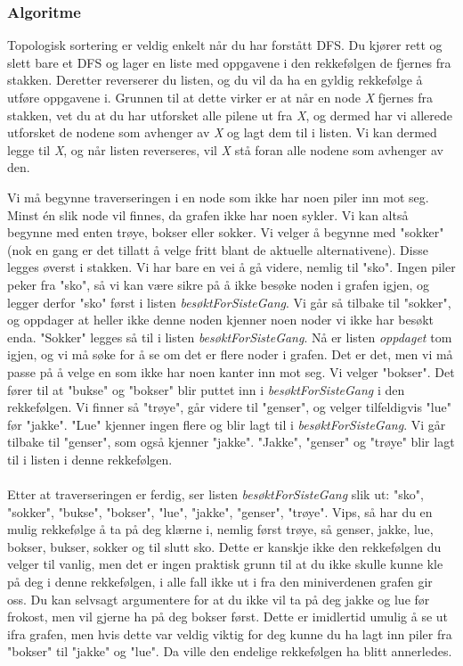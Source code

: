 \subsubsection{Algoritme}
Topologisk sortering er veldig enkelt når du har forstått DFS. Du kjører rett og slett bare et DFS og lager en liste med oppgavene i den rekkefølgen de fjernes fra stakken. Deretter reverserer du listen, og du vil da ha en gyldig rekkefølge å utføre oppgavene i. Grunnen til at dette virker er at når en node \textit{X} fjernes fra stakken, vet du at du har utforsket alle pilene ut fra \textit{X}, og dermed har vi allerede utforsket de nodene som avhenger av \textit{X} og lagt dem til i listen. Vi kan dermed legge til \textit{X}, og når listen reverseres, vil \textit{X} stå foran alle nodene som avhenger av den.

\begin{boxed}
Vi må begynne traverseringen i en node som ikke har noen piler inn mot seg. Minst én slik node vil finnes, da grafen ikke har noen sykler. Vi kan altså begynne med enten trøye, bokser eller sokker.\newline\newline
Vi velger å begynne med "sokker" (nok en gang er det tillatt å velge fritt blant de aktuelle alternativene). Disse legges øverst i stakken. Vi har bare en vei å gå videre, nemlig til "sko". Ingen piler peker fra "sko", så vi kan være sikre på å ikke besøke noden i grafen igjen, og legger derfor "sko" først i listen \textit{besøktForSisteGang}. Vi går så tilbake til "sokker", og oppdager at heller ikke denne noden kjenner noen noder vi ikke har besøkt enda. "Sokker" legges så til i listen \textit{besøktForSisteGang}. Nå er listen \textit{oppdaget} tom igjen, og vi må søke for å se om det er flere noder i grafen. Det er det, men vi må passe på å velge en som ikke har noen kanter inn mot seg. Vi velger "bokser". Det fører til at "bukse" og "bokser" blir puttet inn i \textit{besøktForSisteGang} i den rekkefølgen. Vi finner så "trøye", går videre til "genser", og velger tilfeldigvis "lue" før "jakke". "Lue" kjenner ingen flere og blir lagt til i \textit{besøktForSisteGang}. Vi går tilbake til "genser", som også kjenner "jakke". "Jakke", "genser" og "trøye" blir lagt til i listen i denne rekkefølgen.
\\\\
Etter at traverseringen er ferdig, ser listen \textit{besøktForSisteGang} slik ut: "sko", "sokker", "bukse", "bokser", "lue", "jakke", "genser", "trøye". Vips, så har du en mulig rekkefølge å ta på deg klærne i, nemlig først trøye, så genser, jakke, lue, bokser, bukser, sokker og til slutt sko. Dette er kanskje ikke den rekkefølgen du velger til vanlig, men det er ingen praktisk grunn til at du ikke skulle kunne kle på deg i denne rekkefølgen, i alle fall ikke ut i fra den miniverdenen grafen gir oss. Du kan selvsagt argumentere for at du ikke vil ta på deg jakke og lue før frokost, men vil gjerne ha på deg bokser først. Dette er imidlertid umulig å se ut ifra grafen, men hvis dette var veldig viktig for deg kunne du ha lagt inn piler fra "bokser" til "jakke" og "lue". Da ville den endelige rekkefølgen ha blitt annerledes.
\end{boxed}